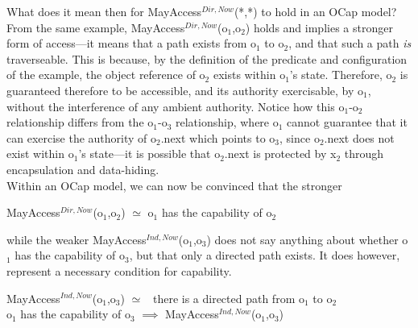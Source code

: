 \documentclass[a4paper,11pt, twoside,twocolumn]{article}
\newenvironment{logic}[1][null]
{\begin{flushleft} \small \label{#1}}
{\end{flushleft}}
\newcommand{\losimeq} {$\simeq$}
\newcommand{\loimplies}{$\implies$}
\newcommand{\ablock} {\null\qquad}
\begin{document}
What does it mean then for MayAccess$^{Dir,Now}$(*,*) to hold in an OCap model? From the same example, MayAccess$^{Dir,Now}$(o$_1$,o$_2$) holds and implies a stronger form of access---it means that a path exists from o$_1$ to o$_2$, and that such a path \textit{is} traverseable. This is because, by the definition of the predicate and configuration of the example, the object reference of o$_2$ exists within o$_1$'s state. Therefore, o$_2$ is guaranteed therefore to be accessible, and its authority exercisable, by o$_1$, without the interference of any ambient authority. Notice how this o$_1$-o$_2$ relationship differs from the o$_1$-o$_3$ relationship, where o$_1$ cannot guarantee that it can exercise the authority of o$_2$.next which points to o$_3$, since o$_2$.next does not exist within o$_1$'s state---it is possible that o$_2$.next is protected by x$_2$ through encapsulation and data-hiding.\\
Within an OCap model, we can now be convinced that the stronger
\begin{logic}
MayAccess$^{Dir,Now}$(o$_1$,o$_2$) \losimeq \linebreak
\ablock o$_1$ has the capability of o$_2$\end{logic}
while the weaker MayAccess$^{Ind,Now}$(o$_1$,o$_3$) does not say anything about whether o$_1$ has the capability of o$_3$, but that only a directed path exists. It does however, represent a necessary condition for capability.
\begin{logic}
MayAccess$^{Ind,Now}$(o$_1$,o$_3$) \losimeq\ \linebreak
\ablock there is a directed path from o$_1$ to o$_2$\linebreak
\\
o$_1$ has the capability of o$_3$ \loimplies \linebreak
\ablock MayAccess$^{Ind,Now}$(o$_1$,o$_3$)\end{logic}
\end{document}
